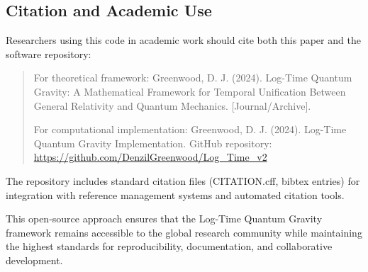 \subsection{Citation and Academic Use}
\label{subsec:citation_academic_use}

Researchers using this code in academic work should cite both this paper and the software repository:

\begin{quote}
For theoretical framework: Greenwood, D. J. (2024). Log-Time Quantum Gravity: A Mathematical Framework for Temporal Unification Between General Relativity and Quantum Mechanics. [Journal/Archive].

For computational implementation: Greenwood, D. J. (2024). Log-Time Quantum Gravity Implementation. GitHub repository: \url{https://github.com/DenzilGreenwood/Log_Time_v2}
\end{quote}

The repository includes standard citation files (CITATION.cff, bibtex entries) for integration with reference management systems and automated citation tools.

This open-source approach ensures that the Log-Time Quantum Gravity framework remains accessible to the global research community while maintaining the highest standards for reproducibility, documentation, and collaborative development.